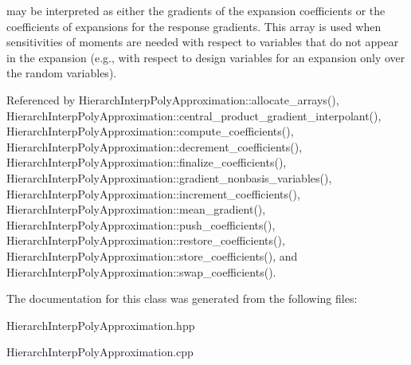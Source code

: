 may be interpreted as either the gradients of the expansion coefficients or the coefficients of expansions for the response gradients. This array is used when sensitivities of moments are needed with respect to variables that do not appear in the expansion (e.\+g., with respect to design variables for an expansion only over the random variables). 

Referenced by Hierarch\+Interp\+Poly\+Approximation\+::allocate\+\_\+arrays(), Hierarch\+Interp\+Poly\+Approximation\+::central\+\_\+product\+\_\+gradient\+\_\+interpolant(), Hierarch\+Interp\+Poly\+Approximation\+::compute\+\_\+coefficients(), Hierarch\+Interp\+Poly\+Approximation\+::decrement\+\_\+coefficients(), Hierarch\+Interp\+Poly\+Approximation\+::finalize\+\_\+coefficients(), Hierarch\+Interp\+Poly\+Approximation\+::gradient\+\_\+nonbasis\+\_\+variables(), Hierarch\+Interp\+Poly\+Approximation\+::increment\+\_\+coefficients(), Hierarch\+Interp\+Poly\+Approximation\+::mean\+\_\+gradient(), Hierarch\+Interp\+Poly\+Approximation\+::push\+\_\+coefficients(), Hierarch\+Interp\+Poly\+Approximation\+::restore\+\_\+coefficients(), Hierarch\+Interp\+Poly\+Approximation\+::store\+\_\+coefficients(), and Hierarch\+Interp\+Poly\+Approximation\+::swap\+\_\+coefficients().



The documentation for this class was generated from the following files\+:\begin{DoxyCompactItemize}
\item 
Hierarch\+Interp\+Poly\+Approximation.\+hpp\item 
Hierarch\+Interp\+Poly\+Approximation.\+cpp\end{DoxyCompactItemize}
